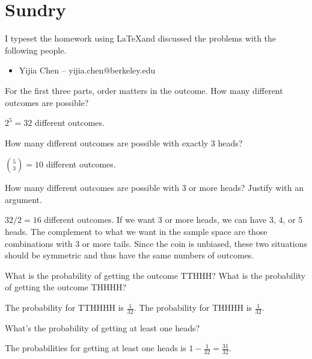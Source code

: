 \documentclass[11pt]{article}
\begin{document}
\section*{Sundry}

\begin{Answer}
    I typeset the homework using \LaTeX and discussed the problems with the following people.
    \begin{itemize}
        \item Yijia Chen -- yijia.chen@berkeley.edu
    \end{itemize}
\end{Answer}

\newpage
{}

\begin{Parts}
    
    \Part For the first three parts, order matters in the outcome. How many different outcomes are possible?
    \begin{Answer}
        $2^5 = 32$ different outcomes. 
    \end{Answer}

    \Part How many different outcomes are possible with exactly 3 heads?
    \begin{Answer}
        ${5 \choose 3} = 10$ different outcomes. 
    \end{Answer}

    \Part How many different outcomes are possible with 3 or more heads? Justify with an argument.
    \begin{Answer}
        ${32 / 2 = 16}$ different outcomes. If we want $3$ or more heads, we can have $3$, $4$, or $5$ heads. The 
        complement to what we want in the sample space are those combinations with $3$ or more tails. Since the 
        coin is unbiased, these two situations should be symmetric and thus have the same numbers of outcomes. 
    \end{Answer}

    \Part What is the probability of getting the outcome TTHHH? What is the probability of getting the outcome THHHH?
    \begin{Answer}
        The probability for TTHHHH is $\frac{1}{32}$. The probability for THHHH is $\frac{1}{32}$.
    \end{Answer}

    \Part What’s the probability of getting at least one heads?
    \begin{Answer}
        The probabilities for getting at least one heads is $1 - \frac{1}{32} = \frac{31}{32}$. 
    \end{Answer}


\end{Parts}
\end{document}
